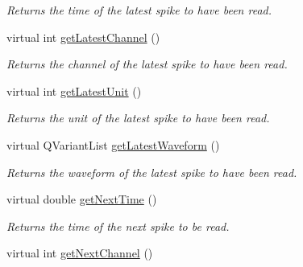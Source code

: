 \begin{DoxyCompactItemize}
\begin{DoxyCompactList}\small\item\em Returns the time of the latest spike to have been read. \end{DoxyCompactList}\item 
\hypertarget{class_picto_1_1_spike_state_ac087316959c5043d45f599f389ddd41d}{virtual int \hyperlink{class_picto_1_1_spike_state_ac087316959c5043d45f599f389ddd41d}{get\-Latest\-Channel} ()}\label{class_picto_1_1_spike_state_ac087316959c5043d45f599f389ddd41d}

\begin{DoxyCompactList}\small\item\em Returns the channel of the latest spike to have been read. \end{DoxyCompactList}\item 
\hypertarget{class_picto_1_1_spike_state_a9db1123ceb0c822830bd9dee8d99d95a}{virtual int \hyperlink{class_picto_1_1_spike_state_a9db1123ceb0c822830bd9dee8d99d95a}{get\-Latest\-Unit} ()}\label{class_picto_1_1_spike_state_a9db1123ceb0c822830bd9dee8d99d95a}

\begin{DoxyCompactList}\small\item\em Returns the unit of the latest spike to have been read. \end{DoxyCompactList}\item 
\hypertarget{class_picto_1_1_spike_state_af2bb21ef00f52743f47bed872450ae22}{virtual Q\-Variant\-List \hyperlink{class_picto_1_1_spike_state_af2bb21ef00f52743f47bed872450ae22}{get\-Latest\-Waveform} ()}\label{class_picto_1_1_spike_state_af2bb21ef00f52743f47bed872450ae22}

\begin{DoxyCompactList}\small\item\em Returns the waveform of the latest spike to have been read. \end{DoxyCompactList}\item 
\hypertarget{class_picto_1_1_spike_state_a211bd6ef7e7e33496f364a48610e34a9}{virtual double \hyperlink{class_picto_1_1_spike_state_a211bd6ef7e7e33496f364a48610e34a9}{get\-Next\-Time} ()}\label{class_picto_1_1_spike_state_a211bd6ef7e7e33496f364a48610e34a9}

\begin{DoxyCompactList}\small\item\em Returns the time of the next spike to be read. \end{DoxyCompactList}\item 
\hypertarget{class_picto_1_1_spike_state_ad898342189c0a565518f98dc4a85172e}{virtual int \hyperlink{class_picto_1_1_spike_state_ad898342189c0a565518f98dc4a85172e}{get\-Next\-Channel} ()}\label{class_picto_1_1_spike_state_ad898342189c0a565518f98dc4a85172e}


\end{DoxyCompactItemize}
